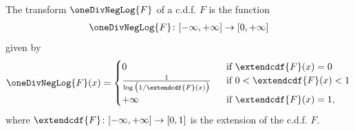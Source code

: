 \begin{definition}
  \label{def:one-div-neg-log-cdf}
  \leanok
  The transform $\oneDivNegLog{F}$ of a c.d.f. $F$ is the function
  \begin{align*}
    \oneDivNegLog{F} \colon [-\infty,+\infty] \to [0,+\infty]
  \end{align*}
  given by
  \begin{align*}
    \oneDivNegLog{F}(x) = \begin{cases}
      0 & \; \text{ if } \extendcdf{F}(x) = 0 \\
      \frac{1}{\log \big( 1/\extendcdf{F}(x) \big)} & \; \text{ if } 0 < \extendcdf{F}(x) < 1 \\
      +\infty & \; \text{ if } \extendcdf{F}(x) = 1 ,
      \end{cases}
  \end{align*}
  where $\extendcdf{F} \colon [-\infty,+\infty] \to [0,1]$ is the extension of the c.d.f. $F$.
\end{definition}

